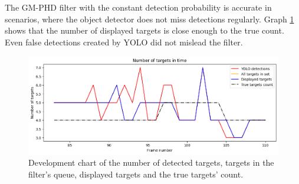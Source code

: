 The GM-PHD filter with the constant detection probability is accurate in scenarios, where the object detector does not
miss detections regularly. Graph \ref{gr:E1-V2-S0} shows that the number of displayed targets is close enough
to the true count. Even false detections created by YOLO did not mislead the filter.


\begin{figure}[H]
    \centering
    \includegraphics[width=\linewidth]{../../../experiments/E1/V2/noPd/staticPd_det}
    \caption{Development chart of the number of detected targets, targets in the filter's queue, displayed targets
    and the
    true
    targets' count.}
    \label{gr:E1-V2-S0}
\end{figure}

